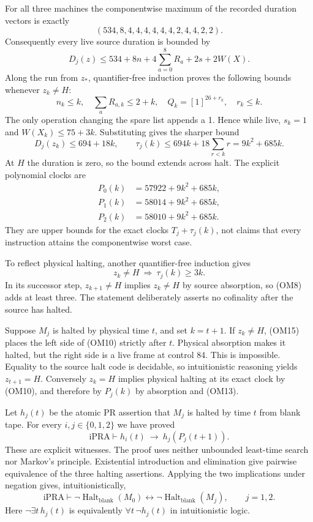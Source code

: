 For all three machines the componentwise maximum of the recorded duration
vectors is exactly
\[
                    (534,8,4,4,4,4,4,4,2,4,4,2,2).       \tag{OM11}
\]
Consequently every live source duration is bounded by
\[
       D_j(z)\le534+8n+4\sum_{a=0}^{8}R_a+2s+2W(X).
\]
Along the run from $z_*$, quantifier-free induction proves the following
bounds whenever $z_k\ne H$:
\[
 n_k\le k,\quad \sum_a R_{a,k}\le2+k,\quad
 Q_k=[1]^{26+r_k},\quad r_k\le k.
                                                               \tag{OM12}
\]
The only operation changing the spare list appends a 1.  Hence while live,
$s_k=1$ and $W(X_k)\le75+3k$.  Substituting gives the sharper bound
\[
 D_j(z_k)\le694+18k,
 \qquad\tau_j(k)\le694k+18\sum_{r<k}r=9k^2+685k.        \tag{OM13}
\]
At $H$ the duration is zero, so the bound extends across halt.
The explicit polynomial clocks are
\[
\begin{split}
 P_0(k)&=57922+9k^2+685k,\\
 P_1(k)&=58014+9k^2+685k,\\
 P_2(k)&=58010+9k^2+685k.
\end{split}                                                  \tag{OM14}
\]
They are upper bounds for the exact clocks $T_j+\tau_j(k)$, not claims
that every instruction attains the componentwise worst case.

To reflect physical halting, another quantifier-free induction gives
\[
              z_k\ne H\ \Longrightarrow\ \tau_j(k)\ge3k. \tag{OM15}
\]
In its successor step, $z_{k+1}\ne H$ implies $z_k\ne H$ by source
absorption, so (OM8) adds at least three.  The statement deliberately
asserts no cofinality after the source has halted.

Suppose $M_j$ is halted by physical time $t$, and set $k=t+1$.
If $z_k\ne H$, (OM15) places the left side of (OM10) strictly after
$t$.  Physical absorption makes it halted, but the right side is a live
frame at control 84.  This is impossible.  Equality to the source halt
code is decidable, so intuitionistic reasoning yields $z_{t+1}=H$.
Conversely $z_k=H$ implies physical halting at its exact clock by (OM10),
and therefore by $P_j(k)$ by absorption and (OM13).

Let $h_j(t)$ be the atomic PR assertion that $M_j$ is halted by time $t$
from blank tape.  For every $i,j\in\{0,1,2\}$ we have proved
\[
              \mathrm{iPRA}\vdash
              h_i(t)\ \longrightarrow\ h_j(P_j(t+1)).    \tag{OM16}
\]
These are explicit witnesses.  The proof uses neither unbounded least-time
search nor Markov's principle.  Existential introduction and elimination
give pairwise equivalence of the three halting assertions.  Applying the
two implications under negation gives, intuitionistically,
\[
 \mathrm{iPRA}\vdash
 \neg\operatorname{Halt}_{\mathrm{blank}}(M_0)
   \longleftrightarrow\neg\operatorname{Halt}_{\mathrm{blank}}(M_j),
 \qquad j=1,2.                                             \tag{OM17}
\]
Here $\neg\exists t\,h_j(t)$ is equivalently
$\forall t\,\neg h_j(t)$ in intuitionistic logic.


